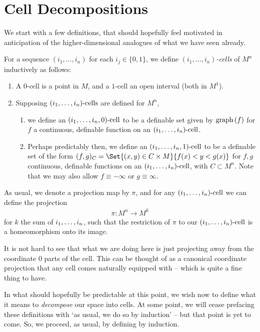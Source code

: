 


\section{Cell Decompositions}

We start with a few definitions, that should hopefully feel motivated in anticipation of the higher-dimensional analogues of what we have seen already.

\begin{definition}[Cells in $M^n$]
  For a sequence $(i_1, \hdots, i_n)$ for each $i_j \in \{0, 1\}$, we define $(i_1, \hdots, i_n)$\emph{-cells} of $M^n$ inductively as follows:
  \begin{enumerate}
    \item A $0$-cell is a point in $M$, and a $1$-cell an open interval (both in $M^1$).
    \item Supposing $(i_1, \hdots, i_n)\textrm{-cells}$ are defined for $M^n$,
	\begin{enumerate}
	  \item we define an $(i_1, \hdots, i_n, 0)\textrm{-cell}$ to be a definable set given by $\operatorname{graph}\left(f\right)$ for $f$ a continuous, definable function on an $(i_1, \hdots, i_n)\textrm{-cell}$.
	  \item Perhaps predictably then, we define an $(i_1, \hdots, i_n, 1)\textrm{-cell}$ to be a definable set of the form $(f, g)_C = \Set{(x, y) \in C \times M}{f(x) < y < g(x)}$ for $f, g$ continuous, definable functions on an $(i_1, \hdots, i_n)\textrm{-cell}$, with $C \subset M^n$. Note that we may also allow $f \equiv - \infty$ or $g \equiv \infty$.
	\end{enumerate}

  \end{enumerate}

  As usual, we denote a projection map by $\pi$, and for any $(i_1, \hdots, i_n)\textrm{-cell}$ we can define the projection
  \begin{align*}
    \pi \colon M^n \to M^k
  \end{align*}
  for $k$ the sum of $i_1, \hdots, i_n$, such that the restriction of $\pi$ to our $(i_1, \hdots, i_n)\textrm{-cell}$ is a homeomorphism onto its image.
\end{definition}

It is not hard to see that what we are doing here is just projecting away from the coordinate 0 parts of the cell. This can be thought of as a canonical coordinate projection that any cell comes naturally equipped with -- which is quite a fine thing to have.

In what should hopefully be predictable at this point, we wish now to define what it means to \emph{decompose} our space into cells. At some point, we will cease prefacing these definitions with `as usual, we do so by induction' -- but that point is yet to come. So, we proceed, as usual, by defining \cds by induction.

